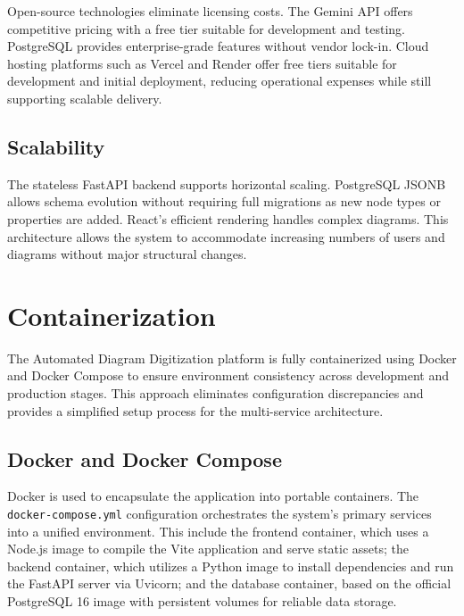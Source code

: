 Open-source technologies eliminate licensing costs. The Gemini 
API offers competitive pricing with a free tier suitable for 
development and testing. PostgreSQL provides enterprise-grade 
features without vendor lock-in. Cloud hosting platforms such 
as Vercel and Render offer free tiers suitable for development 
and initial deployment, reducing operational expenses while 
still supporting scalable delivery.

\subsection{Scalability}
\label{subsec:scalability}

The stateless FastAPI backend supports horizontal scaling. 
PostgreSQL JSONB allows schema evolution without requiring 
full migrations as new node types or properties are added. 
React's efficient rendering handles complex diagrams. This 
architecture allows the system to accommodate increasing 
numbers of users and diagrams without major structural 
changes.

\section{Containerization}
\label{sec:containerization}

The Automated Diagram Digitization platform is fully containerized using Docker and Docker Compose to ensure environment consistency across development and production stages. This approach eliminates configuration discrepancies and provides a simplified setup process for the multi-service architecture.

\subsection{Docker and Docker Compose}
\label{subsec:docker}

Docker is used to encapsulate the application into portable containers. The \texttt{docker-compose.yml} configuration orchestrates the system’s primary services into a unified environment. This include the frontend container, which uses a Node.js image to compile the Vite application and serve static assets; the backend container, which utilizes a Python image to install dependencies and run the FastAPI server via Uvicorn; and the database container, based on the official PostgreSQL 16 image with persistent volumes for reliable data storage.

